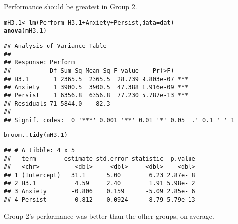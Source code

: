 \documentclass{article}\usepackage[]{graphicx}\usepackage[]{color}
\makeatletter
\newcommand{\hlopt}[1]{\textcolor[rgb]{0,0,0}{#1}}%
\newcommand{\hlstd}[1]{\textcolor[rgb]{0.345,0.345,0.345}{#1}}%
\newcommand{\hlkwb}[1]{\textcolor[rgb]{0.69,0.353,0.396}{#1}}%
\newcommand{\hlkwc}[1]{\textcolor[rgb]{0.333,0.667,0.333}{#1}}%
\newcommand{\hlkwd}[1]{\textcolor[rgb]{0.737,0.353,0.396}{\textbf{#1}}}%
\newenvironment{kframe}{%
 \def\at@end@of@kframe{}%
 \ifinner\ifhmode%
  \def\at@end@of@kframe{\end{minipage}}%
  \begin{minipage}{\columnwidth}%
 \fi\fi%
 \def\FrameCommand##1{\hskip\@totalleftmargin \hskip-\fboxsep
 \colorbox{shadecolor}{##1}\hskip-\fboxsep
     \hskip-\linewidth \hskip-\@totalleftmargin \hskip\columnwidth}%
 \MakeFramed {\advance\hsize-\width
   \@totalleftmargin\z@ \linewidth\hsize
   \@setminipage}}%
 {\par\unskip\endMakeFramed%
 \at@end@of@kframe}
\newenvironment{knitrout}{}{} %
\makeatother
\begin{document}
Performance should be greatest in Group 2. 
\begin{knitrout}
\color{fgcolor}\begin{kframe}
\begin{alltt}
\hlstd{mH3.1} \hlkwb{<-} \hlkwd{lm}\hlstd{(Perform} \hlopt{~} \hlstd{H3.1} \hlopt{+} \hlstd{Anxiety} \hlopt{+} \hlstd{Persist,} \hlkwc{data} \hlstd{= dat)}
\hlkwd{anova}\hlstd{(mH3.1)}
\end{alltt}
\begin{verbatim}
## Analysis of Variance Table
## 
## Response: Perform
##           Df Sum Sq Mean Sq F value    Pr(>F)    
## H3.1       1 2365.5  2365.5  28.739 9.803e-07 ***
## Anxiety    1 3900.5  3900.5  47.388 1.916e-09 ***
## Persist    1 6356.8  6356.8  77.230 5.787e-13 ***
## Residuals 71 5844.0    82.3                      
## ---
## Signif. codes:  0 '***' 0.001 '**' 0.01 '*' 0.05 '.' 0.1 ' ' 1
\end{verbatim}
\begin{alltt}
\hlstd{broom}\hlopt{::}\hlkwd{tidy}\hlstd{(mH3.1)}
\end{alltt}
\begin{verbatim}
## # A tibble: 4 x 5
##   term        estimate std.error statistic  p.value
##   <chr>          <dbl>     <dbl>     <dbl>    <dbl>
## 1 (Intercept)   31.1      5.00        6.23 2.87e- 8
## 2 H3.1           4.59     2.40        1.91 5.98e- 2
## 3 Anxiety       -0.806    0.159      -5.09 2.85e- 6
## 4 Persist        0.812    0.0924      8.79 5.79e-13
\end{verbatim}
\end{kframe}
\end{knitrout}

Group 2's performance was better than the other groups, on average.
\end{document}
